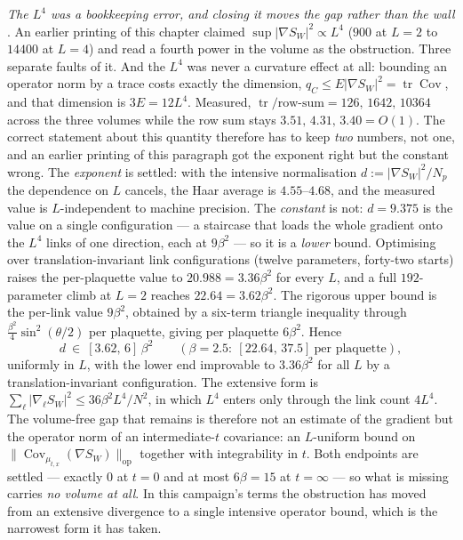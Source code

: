 \emph{The $L^4$ was a bookkeeping error, and closing it moves the gap rather than the wall} \LE. An
earlier printing of this chapter claimed $\sup\lvert\nabla S_W\rvert^2\propto L^4$ ($900$ at $L=2$ to
$14400$ at $L=4$) and read a fourth power in the volume as the obstruction. Three separate faults
of it. And the $L^4$ was never a curvature effect at all: bounding an operator norm by a trace costs
exactly the dimension, $q_C\le E\lvert\nabla S_W\rvert^2=\operatorname{tr}\operatorname{Cov}$, and that
dimension is $3E=12L^4$. Measured, $\operatorname{tr}/\text{row-sum}=126,\,1642,\,10364$ across the
three volumes while the row sum stays $3.51,\,4.31,\,3.40=O(1)$. The correct statement about this
quantity therefore has to keep \emph{two} numbers, not one, and an earlier printing of this paragraph
got the exponent right but the constant wrong. The \emph{exponent} is settled: with the intensive
normalisation $d:=\lvert\nabla S_W\rvert^2/N_p$ the dependence on $L$ cancels, the Haar average is
$4.55$--$4.68$, and the measured value is $L$-independent to machine precision. The \emph{constant} is
not: $d=9.375$ is the value on a single configuration --- a staircase that loads the whole gradient
onto the $L^4$ links of one direction, each at $9\beta^2$ --- so it is a \emph{lower} bound.
Optimising over translation-invariant link configurations (twelve parameters, forty-two starts) raises
the per-plaquette value to $20.988=3.36\beta^2$ for every $L$, and a full $192$-parameter climb at
$L=2$ reaches $22.64=3.62\beta^2$. The rigorous upper bound is the per-link value $9\beta^2$, obtained
by a six-term triangle inequality through $\tfrac{\beta^2}{4}\sin^2(\theta/2)$ per plaquette, giving
per plaquette $6\beta^2$. Hence
\begin{equation}
d\ \in\ [3.62,\,6]\,\beta^2\qquad(\beta=2.5:\ [22.64,\,37.5]\ \text{per plaquette}),
\label{eq:d-bound}
\end{equation}
uniformly in $L$, with the lower end improvable to $3.36\beta^2$ for all $L$ by a translation-invariant
configuration. The extensive form is $\sum_\ell\lvert\nabla_\ell S_W\rvert^2\le36\beta^2L^4/N^2$, in
which $L^4$ enters only through the link count $4L^4$.
The volume-free gap that remains is therefore not an estimate of the gradient but the operator norm of an intermediate-$t$
covariance: an $L$-uniform bound on $\lVert\operatorname{Cov}_{\mu_{t,x}}(\nabla S_W)\rVert_{\mathrm{op}}$
together with integrability in $t$. Both endpoints are settled --- exactly $0$ at $t=0$ and at most
$6\beta=15$ at $t=\infty$ --- so what is missing carries \emph{no volume at all}. In this campaign's
terms the obstruction has moved from an extensive divergence to a single intensive operator bound,
which is the narrowest form it has taken.

